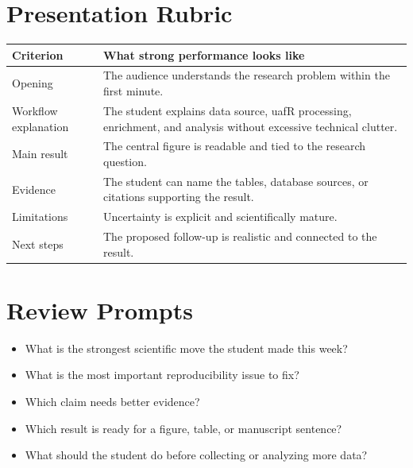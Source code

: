 \section{Presentation Rubric}
\begin{tabularx}{\textwidth}{p{}Y}
\toprule
\textbf{Criterion} & \textbf{What strong performance looks like}\\
\midrule
Opening & The audience understands the research problem within the first minute.\\
Workflow explanation & The student explains data source, uafR processing, enrichment, and analysis without excessive technical clutter.\\
Main result & The central figure is readable and tied to the research question.\\
Evidence & The student can name the tables, database sources, or citations supporting the result.\\
Limitations & Uncertainty is explicit and scientifically mature.\\
Next steps & The proposed follow-up is realistic and connected to the result.\\
\bottomrule
\end{tabularx}

\section{Review Prompts}
\begin{itemize}
  \item What is the strongest scientific move the student made this week?
  \item What is the most important reproducibility issue to fix?
  \item Which claim needs better evidence?
  \item Which result is ready for a figure, table, or manuscript sentence?
  \item What should the student do before collecting or analyzing more data?
\end{itemize}

